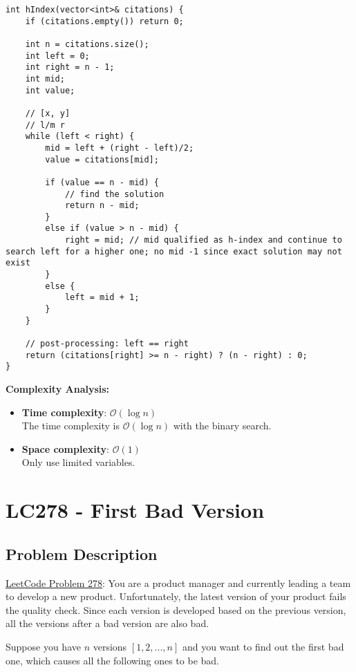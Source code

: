 \documentclass[justified]{tufte-book}
\begin{document}
\begin{lstlisting}
int hIndex(vector<int>& citations) {
    if (citations.empty()) return 0;
    
    int n = citations.size();
    int left = 0;
    int right = n - 1;  
    int mid;
    int value;
    
    // [x, y]
    // l/m r
    while (left < right) {
        mid = left + (right - left)/2;
        value = citations[mid];
        
        if (value == n - mid) {
            // find the solution
            return n - mid;
        }
        else if (value > n - mid) {
            right = mid; // mid qualified as h-index and continue to search left for a higher one; no mid -1 since exact solution may not exist
        }
        else {
            left = mid + 1;
        }
    }
    
    // post-processing: left == right
    return (citations[right] >= n - right) ? (n - right) : 0;   
}
\end{lstlisting}
\noindent \textbf{Complexity Analysis:}
\begin{itemize}
    \item \textbf{Time complexity}: $\mathcal{O}(\log n)$\\
    The time complexity is $\mathcal{O}(\log n)$ with the binary search.
    \item \textbf{Space complexity}: $\mathcal{O}(1)$ \\
    Only use limited variables.
\end{itemize}

\section{LC278 - First Bad Version} \label{sec:lc278_first_bad_version}
\subsection{Problem Description}
\href{https://leetcode.com/problems/first-bad-version/}{LeetCode Problem 278}: You are a product manager and currently leading a team to develop a new product. Unfortunately, the latest version of your product fails the quality check. Since each version is developed based on the previous version, all the versions after a bad version are also bad.

Suppose you have $n$ versions $[1, 2, ..., n]$ and you want to find out the first bad one, which causes all the following ones to be bad.
\end{document}
